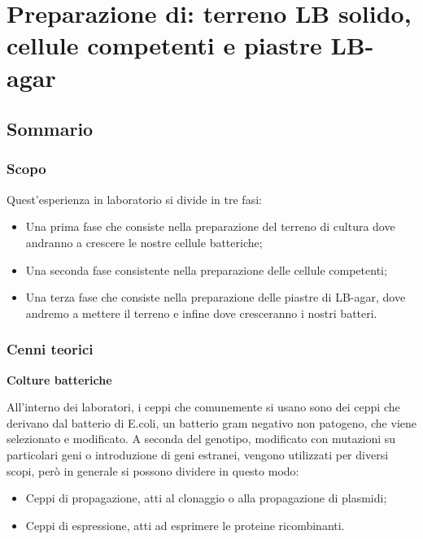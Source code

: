 \section{\LARGE{Preparazione di:  terreno LB solido, cellule competenti e piastre LB-agar }}

\vspace{0.6cm}


\subsection{Sommario}

\subsubsection{Scopo}

Quest'esperienza in laboratorio si divide in tre fasi:
\begin{itemize}
  \item Una prima fase che consiste nella preparazione del terreno di cultura dove
  andranno a crescere le nostre cellule batteriche;
  \item Una seconda fase consistente nella preparazione delle cellule competenti;
  \item Una terza fase che consiste nella preparazione delle piastre di LB-agar,
  dove andremo a mettere il terreno e infine dove cresceranno i nostri batteri.
\end{itemize}


\subsubsection{Cenni teorici}

\textbf{Colture batteriche}
\vspace{0.3cm}

All'interno dei laboratori, i ceppi che comunemente si usano sono dei ceppi
che derivano dal batterio di E.coli, un batterio gram negativo non patogeno,
che viene selezionato e modificato.
A seconda del genotipo, modificato con mutazioni su particolari geni o introduzione
di geni estranei, vengono utilizzati per diversi scopi, però in generale si possono dividere in questo modo:
\begin{itemize}
  \item Ceppi di propagazione, atti al clonaggio o alla propagazione di plasmidi;
  \item Ceppi di espressione, atti ad esprimere le proteine ricombinanti.
\end{itemize}

